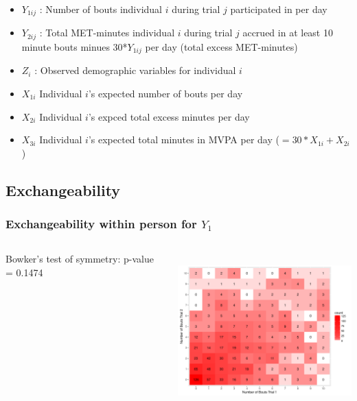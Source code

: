 \documentclass[handout]{beamer}\usepackage[]{graphicx}\usepackage[]{color}
\begin{document}
\begin{frame}


\begin{itemize}
\item
$Y_{1ij}$ : Number of bouts individual $i$ during trial $j$ participated in per day
\item
$Y_{2ij}$ : Total MET-minutes individual $i$ during trial $j$ accrued in at least 10 minute bouts minues 30*$Y_{1ij}$ per day (total excess MET-minutes)
\item
$Z_i$ : Observed demographic variables for individual $i$
\item
$X_{1i}$ Individual $i$'s expected number of bouts per day
\item
$X_{2i}$ Individual $i$'s expced total excess minutes per day
\item
$X_{3i}$ Individual $i$'s expected total minutes in MVPA per day ($= 30*X_{1i}+X_{2i}$)
\end{itemize}

\end{frame}

\subsection{Exchangeability}

\begin{frame}
\frametitle{Exchangeability within person for $Y_1$}
\begin{columns}
\begin{column}{0.3\textwidth}
Bowker's test of symmetry: p-value = 0.1474
\end{column}
\begin{column}{0.7\textwidth}
\includegraphics[height=6cm, width=8cm]{y1exch}
\end{column}
\end{columns}

\end{frame}
\end{document}
